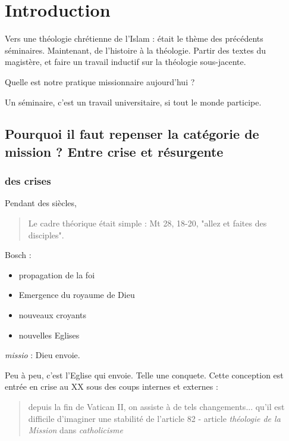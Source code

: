 
\chapter{Introduction}


Vers une théologie chrétienne de l'Islam : était le thème des précédents séminaires.
Maintenant, de l'histoire à la théologie.
Partir des textes du magistère, et faire un travail inductif sur la théologie sous-jacente.
\begin{Synthesis}
Quelle est notre pratique missionnaire aujourd'hui ?
\end{Synthesis}

Un séminaire, c'est un travail universitaire, si tout le monde participe.

\section{Pourquoi il faut repenser la catégorie de mission ? Entre crise et résurgente}

\subsection{des crises}

Pendant des siècles, 
\begin{quote}
Le cadre théorique était simple : Mt 28, 18-20, "allez et faites des disciples". 
\end{quote}

Bosch : 
\begin{itemize}
\item propagation de la foi
\item Emergence du royaume de Dieu
\item nouveaux croyants
\item nouvelles Eglises
\end{itemize}

\begin{Def}[mission]
\textit{missio } : Dieu envoie.

\end{Def}
Peu à peu, c'est l'Eglise qui envoie. Telle une conquete. Cette conception est entrée en crise au XX sous des coups internes et externes : 
\begin{quote}
depuis la fin de Vatican II, on assiste à de tels changements... qu'il est difficile d'imaginer une stabilité de l'article
82 - article \textit{théologie de la Mission} dans \textit{catholicisme}
\end{quote}

